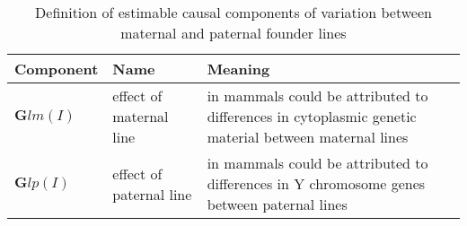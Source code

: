 \begin{table}
\centering
\caption{Definition of estimable causal components of variation between maternal and paternal founder lines}
\label{tab.line}
\vspace{0.1in}
\begin{tabular}{l|p{1.2in}|p{2.4in}}
Component & Name & Meaning \\ \hline
${\bm Glm(I)}$     & effect of maternal line &  in mammals could be attributed to differences in cytoplasmic genetic material between maternal lines  \\
${\bm Glp(I)}$     & effect of paternal line &  in mammals could be attributed to differences in Y chromosome genes between paternal lines \\  \hline
\end{tabular}
\end{table}

